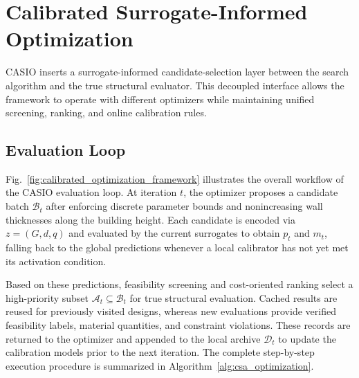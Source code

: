 \section{Calibrated Surrogate-Informed Optimization}
\label{sec:optimization_framework}

CASIO inserts a surrogate-informed candidate-selection layer between the search algorithm and the true structural evaluator. This decoupled interface allows the framework to operate with different optimizers while maintaining unified screening, ranking, and online calibration rules.

\subsection{Evaluation Loop}
\label{subsec:overall_framework}

Fig.~\ref{fig:calibrated_optimization_framework} illustrates the overall workflow of the CASIO evaluation loop. At iteration $t$, the optimizer proposes a candidate batch $\mathcal{B}_t$ after enforcing discrete parameter bounds and nonincreasing wall thicknesses along the building height. Each candidate is encoded via $z=(G,d,q)$ and evaluated by the current surrogates to obtain $p_t$ and $m_t$, falling back to the global predictions whenever a local calibrator has not yet met its activation condition.

Based on these predictions, feasibility screening and cost-oriented ranking select a high-priority subset $\mathcal{A}_t \subseteq \mathcal{B}_t$ for true structural evaluation. Cached results are reused for previously visited designs, whereas new evaluations provide verified feasibility labels, material quantities, and constraint violations. These records are returned to the optimizer and appended to the local archive $\mathcal{D}_t$ to update the calibration models prior to the next iteration. The complete step-by-step execution procedure is summarized in Algorithm~\ref{alg:csa_optimization}.



